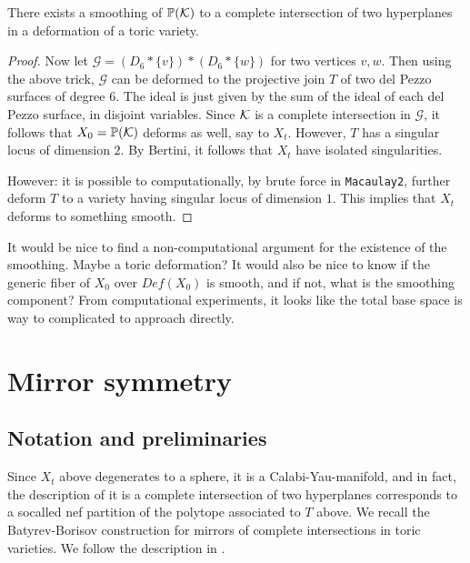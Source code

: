 \documentclass[11pt, english]{article}
\begin{document}
\begin{prop}
There exists a smoothing of $\mathbb{P}(\mathcal K)$ to a complete intersection of two hyperplanes in a deformation of a toric variety.
\end{prop}
\begin{proof}
Now let $\mathcal G=(D_6 \ast \{v \}) \ast (D_6 \ast \{w \})$ for two vertices $v,w$. Then using the above trick, $\mathcal G$ can be deformed to the projective join $T$ of two del Pezzo surfaces of degree $6$. The ideal is just given by the sum of the ideal of each del Pezzo surface, in disjoint   variables. Since $\mathcal K$ is a complete intersection in $\mathcal G$, it follows that $X_0=\mathbb{P}(\mathcal K)$ deforms as well, say to $X_t$. However, $T$ has a singular locus of dimension $2$. By Bertini, it follows that $X_t$ have isolated singularities.

However: it is possible to computationally, by brute force in \verb|Macaulay2|, further deform $T$ to a variety having singular locus of dimension $1$. This implies that $X_t$ deforms to something smooth.
\end{proof}

It would be nice to find a non-computational argument for the existence of the smoothing. Maybe a toric deformation? It would also be nice to know if the generic fiber of $X_0$ over $Def(X_0)$ is smooth, and if not, what is the smoothing component? From computational experiments, it looks like the total base space is way to complicated to approach directly. 

\section{Mirror symmetry}

\subsection{Notation and preliminaries}

Since $X_t$ above degenerates to a sphere, it is a Calabi-Yau-manifold, and in fact, the description of it is a complete intersection of two hyperplanes corresponds to a socalled nef partition of the polytope associated to $T$ above. We recall the Batyrev-Borisov construction for mirrors of complete intersections in toric varieties. We follow the description in \cite{doran_hodgenos}.
\end{document}
